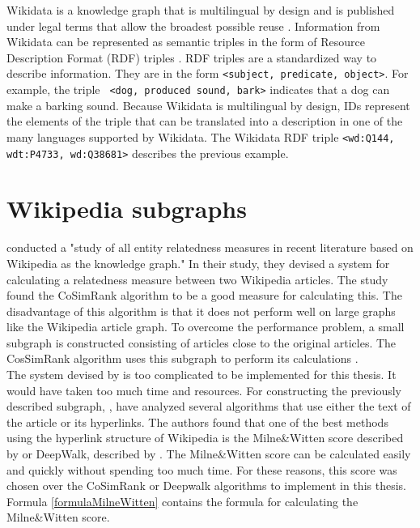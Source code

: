 Wikidata is a knowledge graph that is multilingual by design and is published under legal terms that allow the broadest possible reuse \citep{vrandevcic2014Wikidata}. Information from Wikidata can be represented as semantic triples in the form of Resource Description Format (RDF) triples \citep{erxleben}. RDF triples are a standardized way to describe information. They are in the form \texttt{<subject, predicate, object>}. For example, the triple \texttt{ <dog, produced sound, bark>} indicates that a dog can make a barking sound. Because Wikidata is multilingual by design, IDs represent the elements of the triple that can be translated into a description in one of the many languages supported by Wikidata. The Wikidata RDF triple \texttt{<wd:Q144, wdt:P4733, wd:Q38681>} describes the previous example.\\ 


\section{Wikipedia subgraphs}
\label{secWikipediaSubgraphs}
\citet{Ponza2017} conducted a "study of all entity relatedness measures in recent literature based on Wikipedia as the knowledge graph." In their study, they devised a system for calculating a relatedness measure between two Wikipedia articles. The study found the  CoSimRank algorithm \citep{cosimrank} to be a good measure for calculating this. The disadvantage of this algorithm is that it does not perform well on large graphs like the Wikipedia article graph. To overcome the performance problem, a small subgraph is constructed consisting of articles close to the original articles. The CosSimRank algorithm uses this subgraph to perform its calculations \citep{cosimrank}. \\

The system devised by \citet{Ponza2017} is too complicated to be implemented for this thesis. It would have taken too much time and resources. For constructing the previously described subgraph, \citet{Ponza2017}, have analyzed several algorithms that use either the text of the article or its hyperlinks. The authors found that one of the best methods using the hyperlink structure of Wikipedia is the Milne\&Witten score described by \citet{Witten2008} or DeepWalk, described by \citet{deepwalk}. The Milne\&Witten score can be calculated easily and quickly without spending too much time. For these reasons, this score was chosen over the CoSimRank or Deepwalk algorithms to implement in this thesis. Formula \ref{formulaMilneWitten} contains the formula for calculating the Milne\&Witten score.\\

